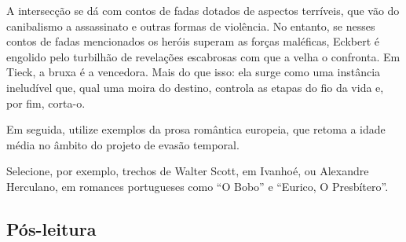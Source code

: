 \documentclass[11pt]{extarticle}
\begin{document}

A intersecção se dá com contos de fadas dotados de aspectos terríveis,
que vão do canibalismo a assassinato e outras formas de violência. No
entanto, se nesses contos de fadas mencionados os heróis superam as
forças maléficas, Eckbert é engolido pelo turbilhão de revelações
escabrosas com que a velha o confronta. Em Tieck, a bruxa é a vencedora.
Mais do que isso: ela surge como uma instância ineludível que, qual uma
moira do destino, controla as etapas do fio da vida e, por fim, corta-o.

Em seguida, utilize exemplos da prosa romântica europeia, que retoma a
idade média no âmbito do projeto de evasão temporal.

Selecione, por exemplo, trechos de Walter Scott, em Ivanhoé, ou
Alexandre Herculano, em romances portugueses como ``O Bobo'' e ``Eurico,
O Presbítero''.

\subsection{Pós-leitura}


\end{document}
